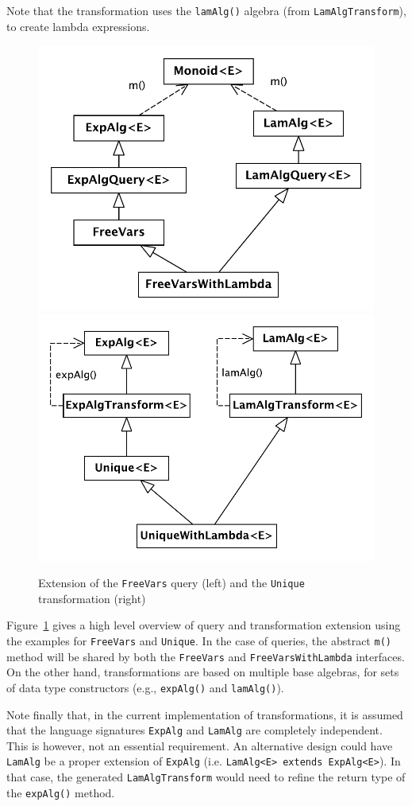 
\noindent Note that the transformation uses the \lstinline{lamAlg()} algebra (from \lstinline{LamAlgTransform}),
to create lambda expressions.


\begin{figure}[t]
  \centering

  \includegraphics[width=0.45\linewidth]{extendQuery}
  \hspace*{2pt}
  \vline
  \hspace*{2pt}
  \includegraphics[width=0.45\linewidth]{extendTransform}
  
  \caption{Extension of the \lstinline{FreeVars} query (left) and the \lstinline{Unique} transformation (right)}
  \label{FIG:extension}
\end{figure}


Figure~\ref{FIG:extension} gives a high level overview of query and transformation extension using the examples for \lstinline{FreeVars} and \lstinline{Unique}. 
In the case of queries, the abstract \lstinline{m()} method will be shared by both the \lstinline{FreeVars} and \lstinline{FreeVarsWithLambda} interfaces.
On the other hand, transformations are based on multiple base algebras, for sets of data type constructors (e.g., \lstinline{expAlg()} and \lstinline{lamAlg()}). 

Note finally that, in the current implementation of \name transformations, it is assumed that the language signatures \lstinline{ExpAlg} and \lstinline{LamAlg} are completely independent.
This is however, not an essential requirement.
An alternative design could have \lstinline{LamAlg} be a proper extension of \lstinline{ExpAlg} (i.e. \lstinline{LamAlg<E> extends ExpAlg<E>}).
In that case, the generated \lstinline{LamAlgTransform} would need to refine the return type of the \lstinline{expAlg()} method. 


